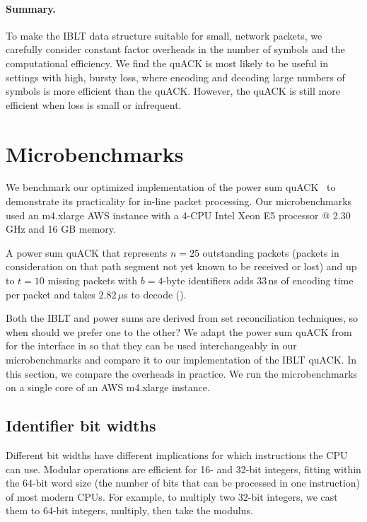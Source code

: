 \paragraph{Summary.}

To make the IBLT data structure suitable for small, network packets, we
carefully consider constant factor overheads in the
number of symbols and the computational efficiency. We find the quACK
is most likely to be useful in settings with high, bursty loss, where
encoding and decoding large numbers of symbols is more efficient than the
quACK. However, the quACK is still more efficient when
loss is small or infrequent.

\section{Microbenchmarks}
\label{sec:quack:microbenchmarks}

We benchmark our optimized implementation of the power sum quACK~\cite{quack-github}
to demonstrate its practicality for in-line packet processing.
Our microbenchmarks used an m4.xlarge AWS instance with a 4-CPU Intel Xeon E5
processor @ 2.30 GHz and 16 GB memory.



A power sum quACK that represents $n=25$ outstanding packets
(packets in consideration on that path segment not yet known to be received or lost)
and up to $t=10$ missing
packets with $b=4$-byte identifiers adds $33$\,ns of encoding time per
packet and takes $2.82$\,$\mu$s to decode ().

Both the IBLT and power sums are derived from set reconciliation
techniques, so when should we prefer one to the other?
We adapt the power sum quACK from \cite{yuan2024sidekick} for the interface
in 
so that they can be used interchangeably in our microbenchmarks and compare
it to our implementation of the IBLT quACK.
In this section, we compare the overheads in practice.
We run the microbenchmarks on a single core of an AWS m4.xlarge instance.



\subsection{Identifier bit widths}
\label{sec:quack:microbenchmarks:bit-widths}

Different bit widths have different implications for
which instructions the CPU can use. Modular operations are efficient
for 16- and 32-bit integers, fitting within the 64-bit word size (the number of
bits that can be processed in one instruction) of most modern CPUs. For example,
to multiply two 32-bit integers, we cast them to 64-bit integers, multiply,
then take the modulus.


